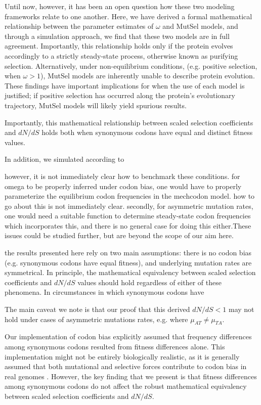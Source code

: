 \documentclass[11pt]{article}
\begin{document}
Until now, however, it has been an open question how these two modeling frameworks relate to one another. Here, we have derived a formal mathematical relationship between the parameter estimates of $\omega$ and MutSel models, and through a simulation approach, we find that these two models are in full agreement. Importantly, this relationship holds only if the protein evolves accordingly to a strictly steady-state process, otherwise known as purifying selection. Alternatively, under non-equilibrium conditions, (e.g. positive selection, when $\omega > 1$), MutSel models are inherently unable to describe protein evolution. These findings have important implications for when the use of each model is justified; if positive selection has occurred along the protein's evolutionary trajectory, MutSel models will likely yield spurious results.


Importantly, this mathematical relationship between scaled selection coefficients and $dN/dS$ holds both when synonymous codons have equal and distinct fitness values.



In addition, we simulated according to 

however, it is not immediately clear how to benchmark these conditions. for omega to be properly inferred under codon bias, one would have to properly parameterize the equilibrium codon frequencies in the mechcodon model. how to go about this is not immediately clear.
secondly, for asymmetric mutation rates, one would need a suitable function to determine steady-state codon frequencies which incorporates this, and there is no general case for doing this either.These issues could be studied further, but are beyond the scope of our aim here. 

the results presented here rely on two main assumptions: there is no codon bias (e.g. synonymous codons have equal fitness), and underlying mutation rates are symmetrical. In principle, the mathematical equivalency between scaled selection coefficients and $dN/dS$ values should hold regardless of either of these phenomena. In circumstances in which synonymous codons have 


The main caveat we note is that our proof that this derived $dN/dS < 1$ may not hold under cases of asymmetric mutations rates, e.g. where $\mu_{AT} \neq \mu_{TA}$.



Our implementation of codon bias explicitly assumed that frequency differences among synonymous codons resulted from fitness differences alone. This implementation might not be entirely biologically realistic, as it is generally assumed that both mutational and selective forces contribute to codon bias in real genomes \cite{Blumer1991, HershbergPetrov2008,PlotkinKudla2010}. However, the key finding that we present is that fitness differences among synonymous codons do not affect the robust mathematical equivalency between scaled selection coefficients and $dN/dS$. 
\end{document}
